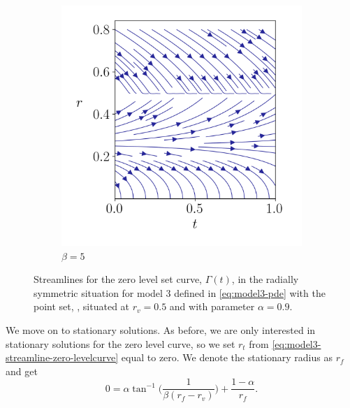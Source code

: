\begin{figure}
\begin{subfigure}{.5\linewidth}
        \includegraphics[width=\linewidth]{figures/streamlines/mod3-a90-b5.png}
        \caption{$\beta=5$}
        \label{fig:arctan-sub2}
    \end{subfigure}
    \caption[Streamlines for model 3]{Streamlines for the zero level set curve, $\Gamma(t)$, in the radially symmetric situation for model 3 defined in \eqref{eq:model3-pde} with the point set, \pointset, situated at $r_v=0.5$ and with parameter $\alpha=0.9$.}
    \label{fig:total-streamline-arctan}
\end{figure}

We move on to stationary solutions. As before, we are only interested in stationary solutions for the zero level curve, so we set $r_t$ from \eqref{eq:model3-streamline-zero-levelcurve} equal to zero.
We denote the stationary radius as $r_f$ and get 
\begin{equation*}
    0 = \alpha \tan^{-1}\bigg( \frac{1}{\beta(r_f-r_v)} \bigg) + \frac{1-\alpha}{r_f}.
\end{equation*} 

\clearpage